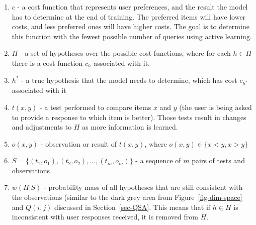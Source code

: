 \documentclass[
  letterpaper,
  numbers=noenddot,
  DIV=11,
  oneside]{scrreprt}
\theoremstyle{remark}
\begin{document}
\begin{enumerate}
\def\labelenumi{\arabic{enumi}.}
\item
  \(c\) - a cost function that represents user preferences, and the
  result the model has to determine at the end of training. The
  preferred items will have lower costs, and less preferred ones will
  have higher costs. The goal is to determine this function with the
  fewest possible number of queries using active learning.
\item
  \(H\) - a set of hypotheses over the possible cost functions, where
  for each \(h \in H\) there is a cost function \(c_h\) associated with
  it.
\item
  \(h^*\) - a true hypothesis that the model needs to determine, which
  has cost \(c_{h^*}\) associated with it
\item
  \(t(x,y)\) - a test performed to compare items \(x\) and \(y\) (the
  user is being asked to provide a response to which item is better).
  Those tests result in changes and adjustments to \(H\) as more
  information is learned.
\item
  \(o(x,y)\) - observation or result of \(t(x,y)\), where
  \(o(x,y) \in \{x<y, x>y\}\)
\item
  \(S = \{(t_1, o_1), (t_2, o_2),...,(t_m, o_m)\}\) - a sequence of
  \(m\) pairs of tests and observations
\item
  \(w(H|S)\) - probability mass of all hypotheses that are still
  consistent with the observations (similar to the dark grey area from
  Figure~\ref{fig-dim-space} and \(Q(i,j)\) discussed in
  Section~\ref{sec-QSA}. This means that if \(h \in H\) is inconsistent
  with user responses received, it is removed from \(H\).
\end{enumerate}
\end{document}

